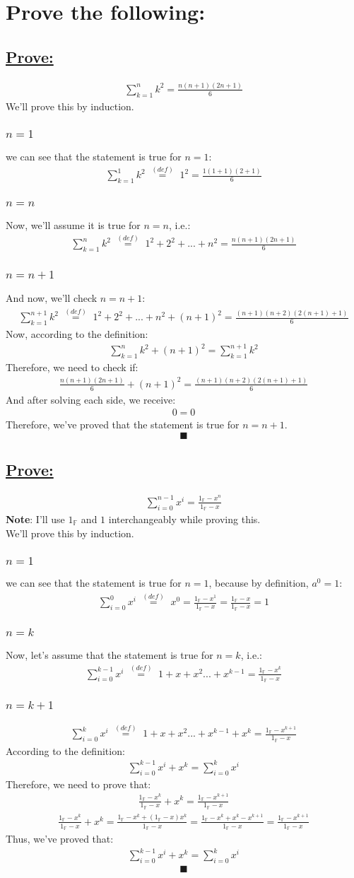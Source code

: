 \documentclass[a4paper, 12pt]{article}
\newcommand{\sub}[1]{\subsection{\underline{#1}}}
\newcommand{\subsub}[1]{\subsubsection{\underline{#1}}}
\newcommand{\?}{\stackrel{?}{=}}
\newcommand{\F}{\ensuremath{\mathbb{F}}}
\newcommand{\Onef}{\ensuremath{1_{\F}}}
\newcommand{\eqbcuz}[1]{\text{~$\stackrel{(#1)}{=}$~}}
\newcommand{\eq}[1]{\begin{align*}#1\end{align*}}
\renewcommand{\qed}{$$\blacksquare$$}
\renewcommand{\b}[1]{\textbf{#1}}
\begin{document}
\section{Prove the following:}
\sub{Prove:}
\eq{\sum^{n}_{k=1}k^{2}=\frac{n(n+1)(2n+1)}{6}}
We'll prove this by induction.
\subsub{$n=1$}
we can see that the statement is true for $n=1$:
\eq{\sum^{1}_{k=1}k^{2}\eqbcuz{def}1^2=\frac{1(1+1)(2+1)}{6}}
\subsub{$n=n$}
Now, we'll assume it is true for $n=n$, i.e.:
\eq{\sum^{n}_{k=1}k^{2}\eqbcuz{def}1^2+2^2+...+n^2=\frac{n(n+1)(2n+1)}{6}}
\subsub{$n=n+1$}
And now, we'll check $n=n+1$:
\eq{\sum^{n+1}_{k=1}k^{2}\eqbcuz{def}1^2+2^2+...+n^2+(n+1)^2=\frac{(n+1)(n+2)(2(n+1)+1)}{6}}
Now, according to the definition: \eq{ \sum^{n}_{k=1}k^{2}+(n+1)^2 = \sum^{n+1}_{k=1}k^{2} }
Therefore, we need to check if: \eq{\frac{n(n+1)(2n+1)}{6}+(n+1)^2=\frac{(n+1)(n+2)(2(n+1)+1)}{6}}
And after solving each side, we receive: \eq{0=0}
Therefore, we've proved that the statement is true for $n=n+1$.
\qed
\sub{Prove:}
\eq{\sum^{n-1}_{i=0}x^{i}=\frac{\Onef-x^n}{\Onef-x}}
\b{Note}: I'll use $\Onef$ and $1$ interchangeably while proving this.\\
We'll prove this by induction.
\subsub{$n=1$}
we can see that the statement is true for $n=1$, because by definition, $a^0=1$:
\eq{\sum^{0}_{i=0}x^{i}\eqbcuz{def}x^0=\frac{\Onef-x^1}{\Onef-x}=\frac{\Onef-x}{\Onef-x}=1}
\subsub{$n=k$}
Now, let's assume that the statement is true for $n=k$, i.e.:
\eq{\sum^{k-1}_{i=0}x^{i}\eqbcuz{def}1+x+x^2...+x^{k-1}=\frac{\Onef-x^k}{\Onef-x}}
\subsub{$n=k+1$}
\eq{\sum^{k}_{i=0}x^{i}\eqbcuz{def}1+x+x^2...+x^{k-1}+x^k=\frac{\Onef-x^{k+1}}{\Onef-x}}
According to the definition:
\eq{ \sum^{k-1}_{i=0}x^{i} + x^k = \sum^{k}_{i=0}x^{i} }
Therefore, we need to prove that:
\eq{ \frac{\Onef-x^k}{\Onef-x} + x^k = \frac{\Onef-x^{k+1}}{\Onef-x} }
\eq{
    \frac{\Onef-x^k}{\Onef-x} + x^k =
    \frac{\Onef-x^k+(\Onef-x)x^k}{\Onef-x} =
    \frac{\Onef-x^k+x^k-x^{k+1}} {\Onef-x} =
    \frac{\Onef-x^{k+1}} {\Onef-x}
}
Thus, we've proved that:
\eq{ \sum^{k-1}_{i=0}x^{i} + x^k = \sum^{k}_{i=0}x^{i} }
\qed

\end{document}
